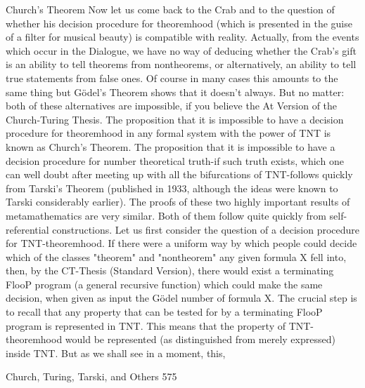 {                                  Church's Theorem
Now let us come back to the Crab and to the question of whether his decision procedure
for theoremhood (which is presented in the guise of a filter for musical beauty) is
compatible with reality. Actually, from the events which occur in the Dialogue, we have
no way of deducing whether the Crab's gift is an ability to tell theorems from
nontheorems, or alternatively, an ability to tell true statements from false ones. Of course
in many cases this amounts to the same thing but Gödel’s Theorem shows that it doesn't
always. But no matter: both of these alternatives are impossible, if you believe the At
Version of the Church-Turing Thesis. The proposition that it is impossible to have a
decision procedure for theoremhood in any formal system with the power of TNT is
known as Church's Theorem. The proposition that it is impossible to have a decision
procedure for number theoretical truth-if such truth exists, which one can well doubt after
meeting up with all the bifurcations of TNT-follows quickly from Tarski's Theorem
(published in 1933, although the ideas were known to Tarski considerably earlier).
        The proofs of these two highly important results of metamathematics are very
similar. Both of them follow quite quickly from self-referential constructions. Let us first
consider the question of a decision procedure for TNT-theoremhood. If there were a
uniform way by which people could decide which of the classes "theorem" and
"nontheorem" any given formula X fell into, then, by the CT-Thesis (Standard Version),
there would exist a terminating FlooP program (a general recursive function) which could
make the same decision, when given as input the Gödel number of formula X. The
crucial step is to recall that any property that can be tested for by a terminating FlooP
program is represented in TNT. This means that the property of TNT-theoremhood would
be represented (as distinguished from merely expressed) inside TNT. But as we shall see
in a moment, this,




Church, Turing, Tarski, and Others                                                        575

}
